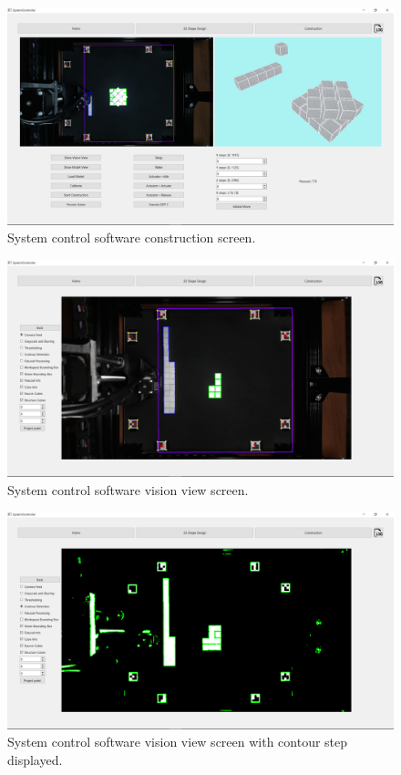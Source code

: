 \begin{figure}[!ht]
	\centering
	\includegraphics[width=1\linewidth]{figures/gui-construction-view2.png}
	\caption{System control software construction screen.}
	\label{fig:gui-construction-view}
\end{figure}

\begin{figure}[!ht]
	\centering
	\includegraphics[width=1\linewidth]{figures/gui-vision-view.png}
	\caption{System control software vision view screen.}
	\label{fig:gui-vision-view}
\end{figure}

\begin{figure}[!ht]
	\centering
	\includegraphics[width=1\linewidth]{figures/gui-vision-view-contour.png}
	\caption{System control software vision view screen with contour step displayed.}
	\label{fig:gui-vision-view-contour}
\end{figure}

